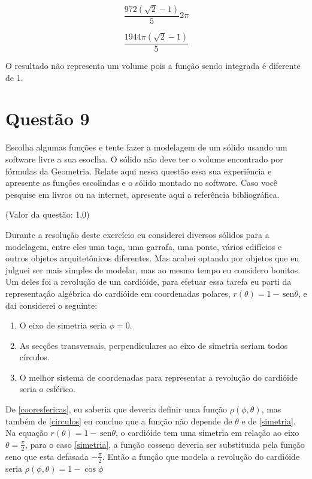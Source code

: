 \documentclass[10pt,a4paper]{article}
\newcommand{\sen}{\hspace{2pt}\textrm{sen}}
\begin{document}
	\begin{equation*}
		\frac{972(\sqrt{2} - 1)}{5} 2\pi
	\end{equation*}
	
	\begin{equation*}
		\frac{1944\pi(\sqrt{2} - 1)}{5}
	\end{equation*}
	
	O resultado não representa um volume pois a função sendo integrada é diferente de 1.
	
	
	\section*{Questão 9}
	
	Escolha algumas funções e tente fazer a modelagem de um sólido usando um software livre a sua esoclha. O sólido não deve ter o volume encontrado por fórmulas da Geometria. Relate aqui nessa questão essa sua experiência e apresente as funções escolindas e o sólido montado no software. Caso você pesquise em livros ou na internet, apresente aqui a referência bibliográfica.
	
	(Valor da questão: 1,0)
	
	Durante a resolução deste exercício eu considerei diversos sólidos para a modelagem, entre eles uma taça, uma garrafa, uma ponte, vários edifícios e outros objetos arquitetônicos diferentes. Mas acabei optando por objetos que eu julguei ser mais simples de modelar, mas ao mesmo tempo eu considero bonitos. Um deles foi a revolução de um cardióide, para efetuar essa tarefa eu parti da representação algébrica do cardióide em coordenadas polares, $ r(\theta) = 1 - \sen \theta $, e daí considerei o seguinte:
	\begin{enumerate}
		\item \label{simetria} O eixo de simetria seria $ \phi = 0 $.
		\item \label{circulos} As secções transversais, perpendiculares ao eixo de simetria seriam todos círculos.
		\item \label {cooresfericas}O melhor sistema de coordenadas para representar a revolução do cardióide seria o esférico.
	\end{enumerate}
	
	De \ref{cooresfericas}, eu saberia que deveria definir uma função $\rho(\phi, \theta)$, mas também de \ref{circulos} eu concluo que a função não depende de $\theta$ e de \ref{simetria}. Na equação $ r(\theta) = 1 - \sen \theta $, o cardióide tem uma simetria em relação ao eixo $\theta = \frac{\pi}{2}$, para o caso \ref{simetria}, a função cosseno deveria ser substituida pela função seno que esta defasada $-\frac{\pi}{2}$. Então a função que modela a revolução do cardióide seria $ \rho(\phi, \theta) = 1 - \cos \phi $
	
\end{document}
